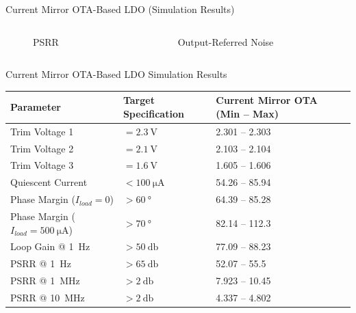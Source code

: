 \documentclass[10pt, aspectratio=169]{beamer}
\newcommand{\svg}[3]{
    \begin{figure}
        \centering
        
        \caption{#2}
    \end{figure}
}
\begin{document}
\begin{frame}{Current Mirror OTA-Based LDO (Simulation Results)}
    \begin{columns}[c,onlytextwidth]
        \begin{column}{0.48\textwidth}
            \svg{../simulations/images/cm_psrr.svg}{PSRR}{1}
        \end{column}
        \begin{column}{0.48\textwidth}
            \svg{../simulations/images/cm_noise.svg}{Output-Referred Noise}{1}
        \end{column}
    \end{columns}
\end{frame}

\begin{frame}{Current Mirror OTA-Based LDO Simulation Results}
    \begin{table}[t]
        \scriptsize
        \renewcommand{\arraystretch}{1.2}
        \label{tab:cm_performance_summary}
        \centering
        \begin{tabularx}{\textwidth}{@{} X X @{} X X @{}}
            \toprule
            \textbf{Parameter} & \textbf{Target Specification} & \textbf{Current Mirror OTA (Min -- Max)} \\
            \midrule
            Trim Voltage 1 & $= \qty{2.3}{\volt}$ & 2.301 -- 2.303 \\
            Trim Voltage 2 & $= \qty{2.1}{\volt}$ & 2.103 -- 2.104 \\
            Trim Voltage 3 & $= \qty{1.6}{\volt}$ & 1.605 -- 1.606 \\
            Quiescent Current & $< \qty{100}{\micro\ampere}$ & 54.26 -- 85.94 \\
            \midrule
            Phase Margin ($I_{load} = 0$) & $> \qty{60}{\degree}$ & 64.39 -- 85.28 \\
            Phase Margin ($I_{load} = \qty{500}{\micro\ampere}$) & $> \qty{70}{\degree}$ & 82.14 -- 112.3 \\
            \midrule
            Loop Gain @ \qty{1}{\hertz} & $> \qty{50}{\decibel}$ & 77.09 -- 88.23 \\
            PSRR @ \qty{1}{\hertz} & $>\qty{65}{\decibel}$ & 52.07 -- 55.5 \\
            PSRR @ \qty{1}{\mega\hertz} & $>\qty{2}{\decibel}$ & 7.923 -- 10.45 \\
            PSRR @ \qty{10}{\mega\hertz} & $>\qty{2}{\decibel}$ & 4.337 -- 4.802 \\
            \midrule

\end{tabularx}
\end{table}
\end{frame}
\end{document}
